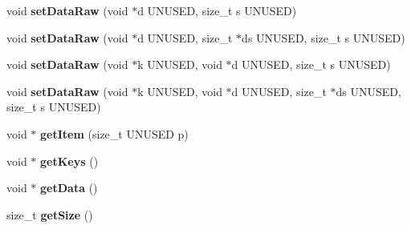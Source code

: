 \begin{DoxyCompactItemize}
\item 
\hypertarget{classfaster_1_1workerFddGroup_add1d3823a8740b3b19fd223255e82193}{}void {\bfseries set\+Data\+Raw} (void $\ast$d U\+N\+U\+S\+E\+D, size\+\_\+t s U\+N\+U\+S\+E\+D)\label{classfaster_1_1workerFddGroup_add1d3823a8740b3b19fd223255e82193}

\item 
\hypertarget{classfaster_1_1workerFddGroup_af6caca6f3f898b13eb6d215d263f9ffd}{}void {\bfseries set\+Data\+Raw} (void $\ast$d U\+N\+U\+S\+E\+D, size\+\_\+t $\ast$ds U\+N\+U\+S\+E\+D, size\+\_\+t s U\+N\+U\+S\+E\+D)\label{classfaster_1_1workerFddGroup_af6caca6f3f898b13eb6d215d263f9ffd}

\item 
\hypertarget{classfaster_1_1workerFddGroup_aedb268724ef26a2b2983e4bea3888e86}{}void {\bfseries set\+Data\+Raw} (void $\ast$k U\+N\+U\+S\+E\+D, void $\ast$d U\+N\+U\+S\+E\+D, size\+\_\+t s U\+N\+U\+S\+E\+D)\label{classfaster_1_1workerFddGroup_aedb268724ef26a2b2983e4bea3888e86}

\item 
\hypertarget{classfaster_1_1workerFddGroup_ad4a8247e1a94473a93967b7e7f86e8d1}{}void {\bfseries set\+Data\+Raw} (void $\ast$k U\+N\+U\+S\+E\+D, void $\ast$d U\+N\+U\+S\+E\+D, size\+\_\+t $\ast$ds U\+N\+U\+S\+E\+D, size\+\_\+t s U\+N\+U\+S\+E\+D)\label{classfaster_1_1workerFddGroup_ad4a8247e1a94473a93967b7e7f86e8d1}

\item 
\hypertarget{classfaster_1_1workerFddGroup_a1bce4be21f1897e9646aa986fb58e644}{}void $\ast$ {\bfseries get\+Item} (size\+\_\+t U\+N\+U\+S\+E\+D p)\label{classfaster_1_1workerFddGroup_a1bce4be21f1897e9646aa986fb58e644}

\item 
\hypertarget{classfaster_1_1workerFddGroup_ade2366aef3d5772b81d6e9f9db9e05f2}{}void $\ast$ {\bfseries get\+Keys} ()\label{classfaster_1_1workerFddGroup_ade2366aef3d5772b81d6e9f9db9e05f2}

\item 
\hypertarget{classfaster_1_1workerFddGroup_a53c9d527b6488cb4fb649cbcade8ff92}{}void $\ast$ {\bfseries get\+Data} ()\label{classfaster_1_1workerFddGroup_a53c9d527b6488cb4fb649cbcade8ff92}

\item 
\hypertarget{classfaster_1_1workerFddGroup_a0337630f440733b964f5983195ba2d68}{}size\+\_\+t {\bfseries get\+Size} ()\label{classfaster_1_1workerFddGroup_a0337630f440733b964f5983195ba2d68}


\end{DoxyCompactItemize}
